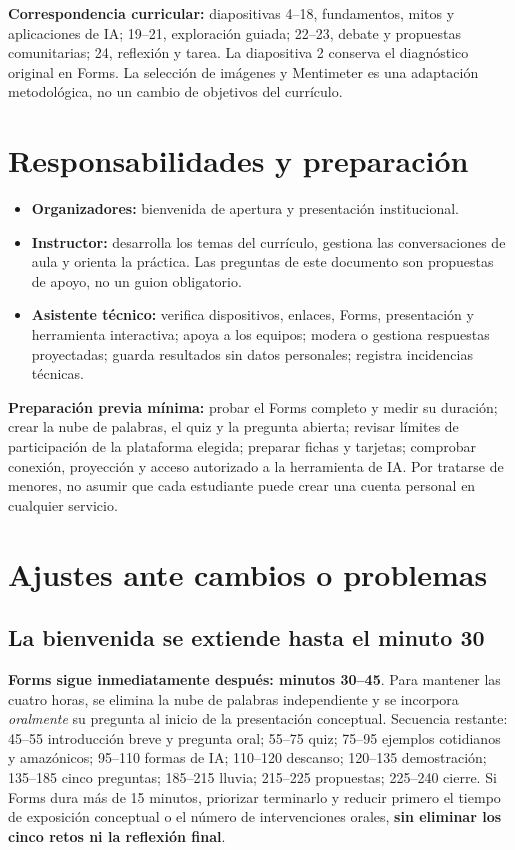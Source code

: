 \documentclass[11pt,a4paper]{article}
\begin{document}
\textbf{Correspondencia curricular:} diapositivas 4--18, fundamentos, mitos y aplicaciones de IA; 19--21, exploración guiada; 22--23, debate y propuestas comunitarias; 24, reflexión y tarea. La diapositiva 2 conserva el diagnóstico original en Forms. La selección de imágenes y Mentimeter es una adaptación metodológica, no un cambio de objetivos del currículo.

\section{Responsabilidades y preparación}
\begin{itemize}
\item \textbf{Organizadores:} bienvenida de apertura y presentación institucional.
\item \textbf{Instructor:} desarrolla los temas del currículo, gestiona las conversaciones de aula y orienta la práctica. Las preguntas de este documento son propuestas de apoyo, no un guion obligatorio.
\item \textbf{Asistente técnico:} verifica dispositivos, enlaces, Forms, presentación y herramienta interactiva; apoya a los equipos; modera o gestiona respuestas proyectadas; guarda resultados sin datos personales; registra incidencias técnicas.
\end{itemize}
\textbf{Preparación previa mínima:} probar el Forms completo y medir su duración; crear la nube de palabras, el quiz y la pregunta abierta; revisar límites de participación de la plataforma elegida; preparar fichas y tarjetas; comprobar conexión, proyección y acceso autorizado a la herramienta de IA. Por tratarse de menores, no asumir que cada estudiante puede crear una cuenta personal en cualquier servicio.

\section{Ajustes ante cambios o problemas}
\subsection*{La bienvenida se extiende hasta el minuto 30}
\textbf{Forms sigue inmediatamente después: minutos 30--45}. Para mantener las cuatro horas, se elimina la nube de palabras independiente y se incorpora \emph{oralmente} su pregunta al inicio de la presentación conceptual. Secuencia restante: 45--55 introducción breve y pregunta oral; 55--75 quiz; 75--95 ejemplos cotidianos y amazónicos; 95--110 formas de IA; 110--120 descanso; 120--135 demostración; 135--185 cinco preguntas; 185--215 lluvia; 215--225 propuestas; 225--240 cierre. Si Forms dura más de 15 minutos, priorizar terminarlo y reducir primero el tiempo de exposición conceptual o el número de intervenciones orales, \textbf{sin eliminar los cinco retos ni la reflexión final}.
\end{document}
